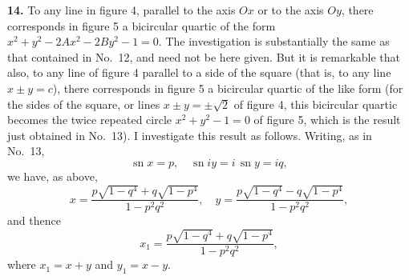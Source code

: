\documentclass[11pt,a4paper]{book}
\begin{document}
{{{\textbf{14.} To any line in figure 4, parallel to the axis $Ox$ or to the axis $Oy$, there
corresponds in figure 5 a bicircular quartic of the form $x^2 + y^2 - 2Ax^2 - 2By^2 - 1 = 0$.
The investigation is substantially the same as that contained in No.~12, and need
not be here given. But it is remarkable that also, to any line of figure 4 parallel
to a side of the square (that is, to any line $x \pm y = c$), there corresponds in figure 5
a bicircular quartic of the like form (for the sides of the square, or lines $x \pm y = \pm \sqrt{2}$
of figure 4, this bicircular quartic becomes the twice repeated circle $x^2 + y^2 - 1 = 0$
of figure 5, which is the result just obtained in No.~13). I investigate this result
as follows. Writing, as in No.~13,
\[
\operatorname{sn} x = p, \quad \operatorname{sn} iy = i\, \operatorname{sn} y = iq,
\]
we have, as above,
\[
x = \frac{p\sqrt{1-q^4} + q\sqrt{1-p^4}}{1-p^2q^2},
\quad
y = \frac{p\sqrt{1-q^4} - q\sqrt{1-p^4}}{1-p^2q^2},
\]
and thence
\[
x_1 = \frac{p\sqrt{1-q^4} + q\sqrt{1-p^4}}{1-p^2q^2},
\]
where $x_1 = x + y$ and $y_1 = x - y$.

}}}
\end{document}
